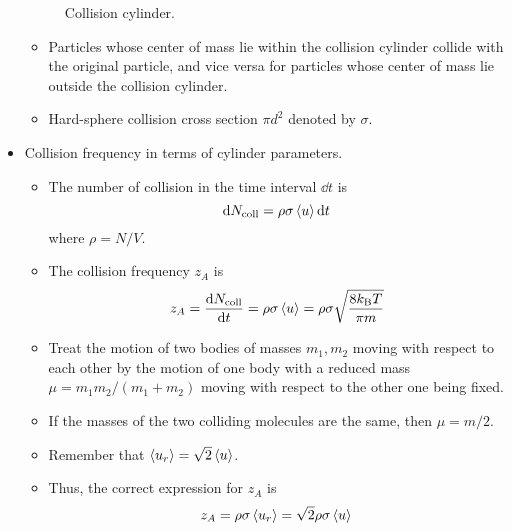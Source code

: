 \documentclass[../notes.tex]{subfiles}
\begin{document}
\begin{itemize}
\begin{figure}[h!]
        \caption{Collision cylinder.}
        \label{fig:collisionCylinder}
    \end{figure}
    \begin{itemize}
        \item Particles whose center of mass lie within the collision cylinder collide with the original particle, and vice versa for particles whose center of mass lie outside the collision cylinder.
        \item Hard-sphere collision cross section $\pi d^2$ denoted by $\sigma$.
    \end{itemize}
    \item Collision frequency in terms of cylinder parameters.
    \begin{itemize}
        \item The number of collision in the time interval $\dd{t}$ is
        \begin{equation*}
            \dd{N_\text{coll}} = \rho\sigma\left\langle{u}\right\rangle\dd{t}
        \end{equation*}
        where $\rho=N/V$.
        \item The collision frequency $z_A$ is
        \begin{equation*}
            z_A = \dv{N_\text{coll}}{t}
            = \rho\sigma\left\langle{u}\right\rangle
            = \rho\sigma\sqrt{\frac{8k_\text{B} T}{\pi m}}
        \end{equation*}
        \item Treat the motion of two bodies of masses $m_1,m_2$ moving with respect to each other by the motion of one body with a reduced mass $\mu=m_1m_2/(m_1+m_2)$ moving with respect to the other one being fixed.
        \item If the masses of the two colliding molecules are the same, then $\mu=m/2$.
        \item Remember that $\left\langle{u_r}\right\rangle=\sqrt{2}\left\langle{u}\right\rangle$.
        \item Thus, the correct expression for $z_A$ is
        \begin{equation*}
            z_A = \rho\sigma\prb{u_r}
            = \sqrt{2}\rho\sigma\prb{u}

\end{equation*}
\end{itemize}
\end{itemize}
\end{document}
